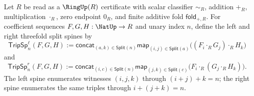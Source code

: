 \begin{definition}
\label{def:fps-threefold-cauchy-split-spines}
Let $R$ be read as a $\RingUp(R)$ certificate with scalar classifier $\sim_R$, addition $+_R$, multiplication $\cdot_R$, zero endpoint $0_R$, and finite additive fold $\mathsf{fold}_{+,R}$. For coefficient sequences $F,G,H:\NatUp\to R$ and unary index $n$, define the left and right threefold split spines by
$$
\mathsf{TripSp}^{\ell}_n(F,G,H)
:=
\mathsf{concat}_{(a,k)\in\mathsf{Split}(n)}
\mathsf{map}_{(i,j)\in\mathsf{Split}(a)}
\bigl((F_i\cdot_R G_j)\cdot_R H_k\bigr)
$$
and
$$
\mathsf{TripSp}^{r}_n(F,G,H)
:=
\mathsf{concat}_{(i,c)\in\mathsf{Split}(n)}
\mathsf{map}_{(j,k)\in\mathsf{Split}(c)}
\bigl(F_i\cdot_R(G_j\cdot_R H_k)\bigr).
$$
The left spine enumerates witnesses $(i,j,k)$ through $(i+j)+k=n$; the right spine enumerates the same triples through $i+(j+k)=n$.
\end{definition}


